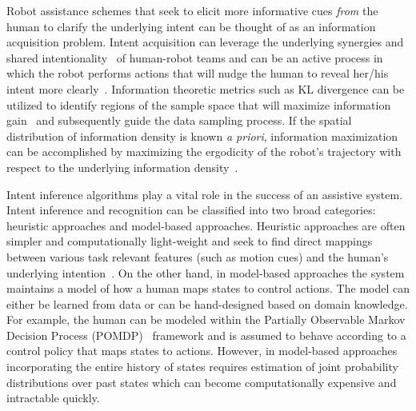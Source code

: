 \documentclass[conference]{IEEEtran}
\begin{document}
Robot assistance schemes that seek to elicit more informative cues \textit{from} the human to clarify the underlying intent can be thought of as an information acquisition problem. Intent acquisition can leverage the underlying synergies and shared intentionality~\citep{tomasello2007shared} of human-robot teams and can be an active process in which the robot performs actions 
that will nudge the human to reveal her/his intent more clearly~\cite{sadigh2016information}. Information theoretic metrics such as KL divergence can be utilized to identify regions of the sample space that will maximize information gain~\citep{tong2001active} and subsequently guide the data sampling process. 
If the spatial distribution of information density is known \textit{a priori}, information maximization can be accomplished by maximizing the ergodicity of the robot's trajectory with respect to the underlying information density~\citep{miller2016ergodic}. 

 Intent inference algorithms play a vital role in the success of an assistive system. Intent inference and recognition can be classified into two broad categories: heuristic approaches and model-based approaches. Heuristic approaches are often simpler and computationally light-weight and seek to find direct mappings between various task relevant features (such as motion cues) and the human's underlying intention~\citep{baker2007goal}. On the other hand, in model-based approaches the system maintains a model of how a human maps states to control actions. The model can either be learned from data or can be hand-designed based on domain knowledge. For example, the human can be modeled within the Partially Observable Markov Decision Process (POMDP)~\citep{taha2011pomdp} framework and is assumed to behave according to a control policy that maps states to actions. However, in model-based approaches incorporating the entire history of states requires estimation of joint probability distributions over past states which can become computationally expensive and intractable quickly.
\end{document}
